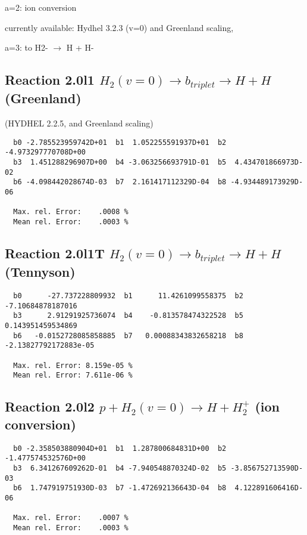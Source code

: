 \documentclass[12pt]{article}
\begin{document}
a=2: ion conversion

     currently available: Hydhel 3.2.3 (v=0) and Greenland scaling,

a=3: to H2- $\rightarrow$ H + H-



\subsection{
Reaction 2.0l1
$ H_2(v=0) \rightarrow b_{triplet}\rightarrow H + H $ (Greenland) 
}

(HYDHEL 2.2.5, and Greenland scaling)


\begin{small}\begin{verbatim}
  b0 -2.785523959742D+01  b1  1.052255591937D+01  b2 -4.973297770708D+00
  b3  1.451288296907D+00  b4 -3.063256693791D-01  b5  4.434701866973D-02
  b6 -4.098442028674D-03  b7  2.161417112329D-04  b8 -4.934489173929D-06

  Max. rel. Error:    .0008 %
  Mean rel. Error:    .0003 %
\end{verbatim}\end{small}
\subsection{
Reaction 2.0l1T
$  H_2(v=0) \rightarrow b_{triplet}\rightarrow H + H $ (Tennyson)
}

\begin{small}\begin{verbatim}
  b0      -27.737228809932  b1      11.4261099558375  b2     -7.10684878187016
  b3      2.91291925736074  b4    -0.813578474322528  b5     0.143951459534869
  b6   -0.0152728085858885  b7   0.00088343832658218  b8 -2.13827792172883e-05

  Max. rel. Error: 8.159e-05 %
  Mean rel. Error: 7.611e-06 %
\end{verbatim}\end{small}
\subsection{
Reaction 2.0l2
$ p + H_2(v=0) \rightarrow H + H_2^+$ (ion conversion)
}


\begin{small}\begin{verbatim}
  b0 -2.358503880904D+01  b1  1.287800684831D+00  b2 -1.477574532576D+00
  b3  6.341267609262D-01  b4 -7.940548870324D-02  b5 -3.856752713590D-03
  b6  1.747919751930D-03  b7 -1.472692136643D-04  b8  4.122891606416D-06

  Max. rel. Error:    .0007 %
  Mean rel. Error:    .0003 %
\end{verbatim}\end{small}
\end{document}
